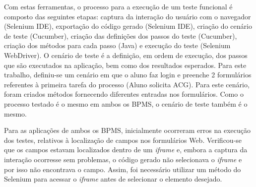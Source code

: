 \documentclass[12pt]{article}
\begin{document}




Com estas ferramentas, o processo para a execução de um teste funcional é composto das seguintes etapas: captura da interação do usuário com o navegador (Selenium IDE), exportação do código gerado (Selenium IDE), criação do cenário de teste (Cucumber), criação das definições dos passos do teste (Cucumber), criação dos métodos para cada passo (Java) e execução do teste (Selenium WebDriver). O cenário de teste é a definição, em ordem de execução, dos passos que são executados na aplicação, bem como dos resultados esperados. Para este trabalho, definiu-se um cenário em que o aluno faz login e preenche 2 formulários referentes à primeira tarefa do processo (Aluno solicita ACG). Para este cenário, foram criados métodos fornecendo diferentes entradas nos formulários. Como o processo testado é o mesmo em ambos os BPMS, o cenário de teste também é o mesmo. 


Para as aplicações de ambos os BPMS, inicialmente ocorreram erros na execução dos testes, relativos à localização de campos nos formulários Web. Verificou-se que os campos estavam localizados dentro de um \emph{iframe} e, embora a captura da interação ocorresse sem problemas, o código gerado não selecionava o \emph{iframe} e por isso não encontrava o campo. Assim, foi necessário utilizar um método do Selenium para acessar o \emph{iframe} antes de selecionar o elemento desejado.

\end{document}
